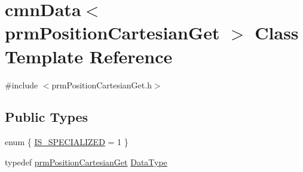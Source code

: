 \hypertarget{classcmn_data_3_01prm_position_cartesian_get_01_4}{\section{cmn\-Data$<$ prm\-Position\-Cartesian\-Get $>$ Class Template Reference}
\label{classcmn_data_3_01prm_position_cartesian_get_01_4}
}


{\ttfamily \#include $<$prm\-Position\-Cartesian\-Get.\-h$>$}

\subsection*{Public Types}
\begin{DoxyCompactItemize}
\item 
enum \{ \hyperlink{classcmn_data_3_01prm_position_cartesian_get_01_4_a8434841f9b5f55a6f6c6aea4ad73432eaa35464157c7a973842df69ab3f77f317}{I\-S\-\_\-\-S\-P\-E\-C\-I\-A\-L\-I\-Z\-E\-D} = 1
 \}
\item 
typedef \hyperlink{classprm_position_cartesian_get}{prm\-Position\-Cartesian\-Get} \hyperlink{classcmn_data_3_01prm_position_cartesian_get_01_4_a4c0c73a046fbb0962651979bd5734bbd}{Data\-Type}
\end{DoxyCompactItemize}
